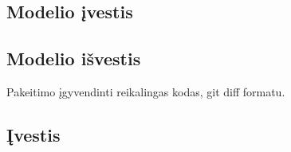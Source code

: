 \documentclass{VUMIFPSbakalaurinis}
\begin{document}
\subsection{Modelio įvestis}



\subsection{Modelio išvestis}

Pakeitimo įgyvendinti reikalingas kodas, git diff formatu.

\subsection{Įvestis}



\end{document}
